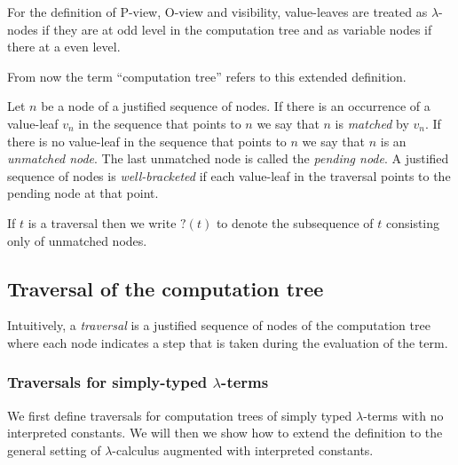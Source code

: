 For the definition
of P-view, O-view and visibility, value-leaves are treated as
$\lambda$-nodes if they are at odd level in the computation tree and
as variable nodes if there at a even level.

From now the term ``computation tree'' refers to this extended
definition.
\vspace{10pt}

Let $n$ be a node of a justified sequence of nodes.
If there is an occurrence of a value-leaf $v_n$ in the sequence that points to $n$ we say that
$n$ is \emph{matched} by $v_n$. If there is no value-leaf in the sequence that points to $n$ we
say that $n$ is an \emph{unmatched node}.
The last unmatched node is called the \emph{pending node}.
A justified sequence of nodes is \emph{well-bracketed} if
each value-leaf in the traversal points to the pending node at that point.

If $t$ is a traversal then we write $?(t)$ to denote the subsequence
of $t$ consisting only of unmatched nodes.

\subsection{Traversal of the computation tree}
\label{subsec:traversal}
Intuitively, a \emph{traversal} is a justified sequence of nodes of the computation tree where each node indicates a step that is taken during the evaluation of the term.

\subsubsection{Traversals for simply-typed $\lambda$-terms}
We first define traversals for computation trees of simply typed $\lambda$-terms with no interpreted constants.
We will then we show how to extend the definition to the general setting of $\lambda$-calculus augmented with interpreted constants.

